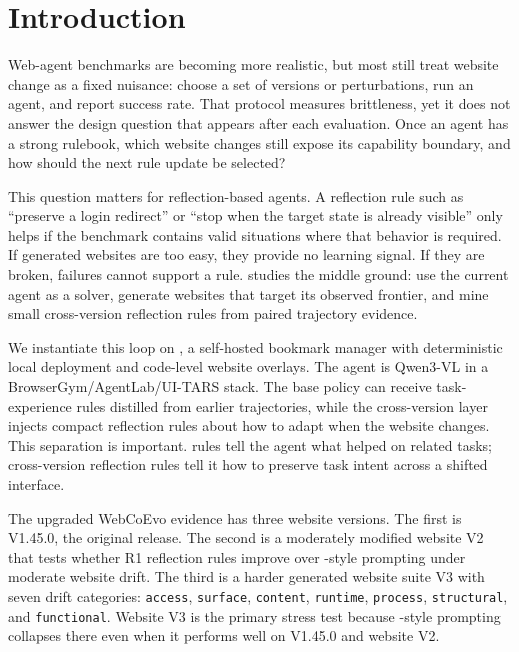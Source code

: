 \section{Introduction}

Web-agent benchmarks are becoming more realistic, but most still treat website change as a fixed nuisance: choose a set of versions or perturbations, run an agent, and report success rate. That protocol measures brittleness, yet it does not answer the design question that appears after each evaluation. Once an agent has a strong rulebook, which website changes still expose its capability boundary, and how should the next rule update be selected?

This question matters for reflection-based agents. A reflection rule such as ``preserve a login redirect'' or ``stop when the target state is already visible'' only helps if the benchmark contains valid situations where that behavior is required. If generated websites are too easy, they provide no learning signal. If they are broken, failures cannot support a rule. \webcoevo{} studies the middle ground: use the current agent as a solver, generate websites that target its observed frontier, and mine small cross-version reflection rules from paired trajectory evidence.

We instantiate this loop on \linkding{}, a self-hosted bookmark manager with deterministic local deployment and code-level website overlays. The agent is Qwen3-VL in a BrowserGym/AgentLab/UI-TARS stack. The base policy can receive \expel{} task-experience rules distilled from earlier trajectories, while the cross-version layer injects compact reflection rules about how to adapt when the website changes. This separation is important. \expel{} rules tell the agent what helped on related tasks; cross-version reflection rules tell it how to preserve task intent across a shifted interface.

The upgraded WebCoEvo evidence has three website versions. The first is \linkding{} V1.45.0, the original release. The second is a moderately modified website V2 that tests whether R1 reflection rules improve over \expel{}-style prompting under moderate website drift. The third is a harder generated website suite V3 with seven drift categories: \texttt{access}, \texttt{surface}, \texttt{content}, \texttt{runtime}, \texttt{process}, \texttt{structural}, and \texttt{functional}. Website V3 is the primary stress test because \expel{}-style prompting collapses there even when it performs well on \linkding{} V1.45.0 and website V2.

